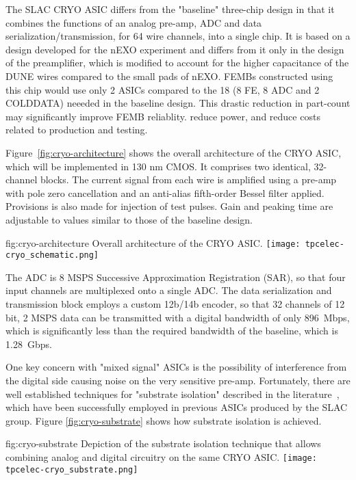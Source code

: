 The SLAC CRYO ASIC differs from the "baseline" three-chip design in that it combines the functions of an analog pre-amp, ADC and data serialization/transmission, for 64 wire channels, into a single chip.
It is based on a design developed for the nEXO experiment and differs from it only in the design of the preamplifier, which is modified to account for the higher capacitance of the DUNE wires compared to the small pads of nEXO.
FEMBs constructed using this chip would use only 2 ASICs compared to the 18 (8 FE, 8 ADC and 2 COLDDATA) neeeded in the baseline design.
This drastic reduction in part-count may significantly improve FEMB reliablity. reduce power, and reduce costs related to production and testing. 

Figure~\ref{fig:cryo-architecture} shows the overall architecture of the CRYO ASIC, which will be implemented in 130 nm CMOS.
It comprises two identical, 32-channel blocks. 
The current signal from each wire is amplified using a pre-amp with pole zero cancellation and an anti-alias fifth-order Bessel filter applied. 
Provisions is also made for injection of test pulses. 
Gain and peaking time are adjustable to values similar to those of the baseline design.

\begin{dunefigure}
{fig:cryo-architecture}
{Overall architecture of the CRYO ASIC.}
\texttt{[image: tpcelec-cryo\_schematic.png]}
\end{dunefigure}

The ADC is 8 MSPS Successive Approximation Registration (SAR), so that four input channels are multiplexed onto a single ADC. The data serialization and transmission block employs a custom 12b/14b encoder, so that 32 channels of 12 bit, 2 MSPS data can be transmitted with a digital bandwidth of only 896~Mbps, which is significantly less than the required bandwidth of the baseline, which is 1.28~Gbps.

One key concern with "mixed signal" ASICs is the possibility of interference from the digital side causing noise on the very sensitive pre-amp. 
Fortunately, there are well established techniques for "substrate isolation" described in the literature~\cite{yeh}, which have been successfully employed in previous ASICs produced by the SLAC group. Figure \ref{fig:cryo-substrate} shows how substrate isolation is achieved. 

\begin{dunefigure}
{fig:cryo-substrate}
{Depiction of the substrate isolation technique that allows combining analog and digital circuitry on the same CRYO ASIC.}
\texttt{[image: tpcelec-cryo\_substrate.png]}
\end{dunefigure}

